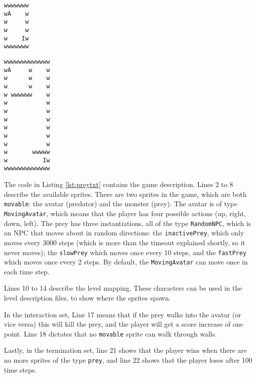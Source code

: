 \begin{minipage}[t]{.4\textwidth}
	\lstset{
		caption=Prey level 1, 
		label=lst:prey1,
		basicstyle=\footnotesize, frame=tb,
		xleftmargin=.1\textwidth, xrightmargin=.1\textwidth
	}
	\begin{lstlisting}
wwwwwww
wA    w
w     w
w     w
w    Iw
wwwwwww
	\end{lstlisting}
\end{minipage}
\begin{minipage}[t]{.5\textwidth}
	\lstset{
		caption=Prey level 2,
		label=lst:prey2,
		basicstyle=\footnotesize, frame=tb,
		xleftmargin=.1\textwidth, xrightmargin=.1\textwidth
	}
	\begin{lstlisting}
wwwwwwwwwwwww
wA     w    w
w      w    w
w      w    w
w wwwwww    w
w           w
w           w
w           w
w           w
w           w
w           w
w       wwwww
w          Iw
wwwwwwwwwwwww
	\end{lstlisting}
\end{minipage}

The code in Listing \ref{lst:preytxt} contains the game description. Lines 2 to
8 describe the available sprites. There are two sprites in the game, which are
both \texttt{movable}: the avatar (predator) and the monster (prey).  The avatar
is of type \texttt{MovingAvatar}, which means that the player has four possible
actions (up, right, down, left). The prey has three instantiations, all of the
type \texttt{RandomNPC}, which is an NPC that moves about in random directions:
the \texttt{inactivePrey}, which only moves every 3000 steps (which is more than
the timeout explained shortly, so it never moves); the \texttt{slowPrey} which
moves once every 10 steps, and the \texttt{fastPrey} which moves once every 2
steps.  By default, the \texttt{MovingAvatar} can move once in each time step.

Lines 10 to 14 describe the level mapping. These characters can be used in the
level description files, to show where the sprites spawn. 

In the interaction set, Line 17 means that if the prey walks into the avatar (or
vice versa) this will kill the prey, and the player will get a score increase of
one point. Line 18 dictates that no \texttt{movable} sprite can walk through
walls.

Lastly, in the termination set, line 21 shows that the player wins when there
are no more sprites of the type \texttt{prey}, and line 22 shows that the player
loses after 100 time steps.

